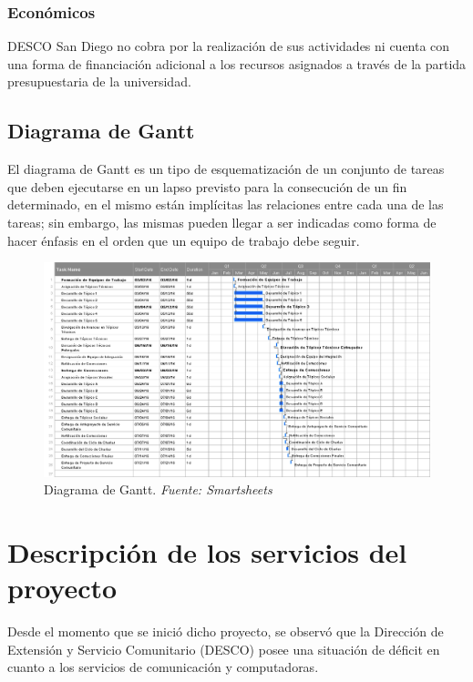 \documentclass[11pt, a4paper, twosides]{report}
\begin{document}
\subsection{Económicos}
 DESCO San Diego no cobra por la realización de sus actividades ni cuenta con una forma de financiación adicional a los recursos asignados a través de la partida presupuestaria de la universidad.
 
 \newpage
\section{Diagrama de Gantt}
 El diagrama de Gantt es un tipo de esquematización de un conjunto de tareas que deben ejecutarse en un lapso previsto para la consecución de un fin determinado, en el mismo están implícitas las relaciones entre cada una de las tareas; sin embargo, las mismas pueden llegar a ser indicadas como forma de hacer énfasis en el orden que un equipo de trabajo debe seguir.\\

 \begin{figure}[H]
 	\centering
 	\includegraphics[width=1\textwidth, heigth=0.5\textwidth, angle=270]{fig3}
 	\caption{Diagrama de Gantt. \textit{Fuente: Smartsheets}}
 \end{figure}
 
\chapter{Descripción de los servicios del\\ proyecto}
Desde el momento que se inició dicho proyecto, se observó que la Dirección de Extensión y Servicio Comunitario (DESCO) posee una situación de déficit en cuanto a los servicios de comunicación y computadoras.
\end{document}
